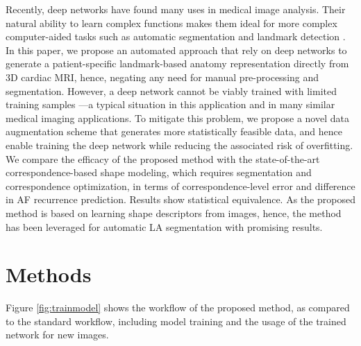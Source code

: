 \documentclass[twocolumn]{cinc}
\begin{document}
Recently, deep networks have found many uses in medical image analysis. Their natural ability to learn complex functions makes them ideal for more complex computer-aided tasks such as automatic segmentation \cite{ronneberger2015unet} and landmark detection \cite{zheng2015detection}. In this paper, we propose an automated approach that rely on deep networks to generate a patient-specific landmark-based anatomy representation directly from 3D cardiac MRI, hence, negating any need for manual pre-processing and segmentation. 
However, a deep network cannot be viably trained with limited training samples ---a typical situation in this application and in many similar medical imaging applications.
To mitigate this problem, we propose a novel data augmentation scheme that generates more statistically feasible data, and hence enable training the deep network while reducing the associated risk of overfitting.
We compare the efficacy of the proposed method with the state-of-the-art correspondence-based shape modeling, which requires segmentation and correspondence optimization, in terms of correspondence-level error and difference in AF recurrence prediction. Results show statistical equivalence. As the proposed method is based on learning shape descriptors from images, hence, the method has been leveraged for automatic LA segmentation with  promising results.
\vspace{-0.1in}
\section{Methods}
 \vspace{-0.1in}
Figure \ref{fig:trainmodel} shows the workflow of the proposed method, as compared to the standard workflow, including model training and the usage of the trained network for new images.
\end{document}
